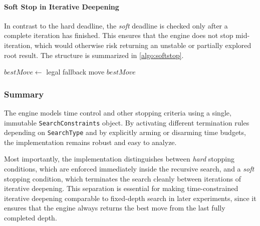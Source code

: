 \paragraph{Soft Stop in Iterative Deepening}
In contrast to the hard deadline, the \emph{soft} deadline is checked only after
a complete iteration has finished. This ensures that the engine does not stop
mid-iteration, which would otherwise risk returning an unstable or partially
explored root result. The structure is summarized in \cref{algo:softstop}.

\begin{algorithm}[ht]
\DontPrintSemicolon
{}

$bestMove \gets$ legal fallback move\;
\Return $bestMove$\;
\caption{Soft stopping policy at iteration boundaries (iterative deepening).}
\label{algo:softstop}
\end{algorithm}

\subsubsection{Summary}

The engine models time control and other stopping criteria using a single,
immutable \texttt{SearchConstraints} object. By activating different termination
rules depending on \texttt{SearchType} and by explicitly arming or disarming time
budgets, the implementation remains robust and easy to analyze.

Most importantly, the implementation distinguishes between \emph{hard} stopping
conditions, which are enforced immediately inside the recursive search, and a
\emph{soft} stopping condition, which terminates the search cleanly between
iterations of iterative deepening. This separation is essential for making
time-constrained iterative deepening comparable to fixed-depth search in later
experiments, since it ensures that the engine always returns the best move from
the last fully completed depth.